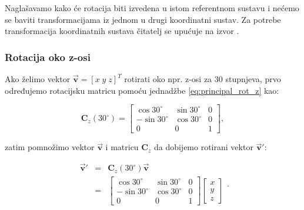 \documentclass[times, utf8, diplomski, numeric]{templates/template}
\begin{document}
{{{            Naglašavamo kako će rotacija biti izvedena u istom referentnom sustavu i nećemo se baviti transformacijama iz jednom u drugi koordinatni sustav. Za potrebe transformacija koordinatnih sustava čitatelj se upućuje na izvor \cite{adcsKnjiga}.

            \subsubsection{Rotacija oko z-osi}{
                Ako želimo vektor $\overrightarrow{\textbf{v}}=\left[ x \; y \; z \right]^T$ rotirati oko npr. z-osi za 30 stupnjeva, prvo određujemo rotacijsku matricu pomoću jednadžbe \ref{eq:principal_rot_z} kao:

                \begin{equation}
                \textbf{C}_{z}(30^{\circ}) = 
                \begin{bmatrix}
                    \cos30^{\circ}   & \sin30^{\circ}    &  0 \\
                    -\sin30^{\circ}  & \cos30^{\circ}    &  0 \\
                    0                & 0                 &  1
                \end{bmatrix}
                ,
                \end{equation}

                zatim pomnožimo vektor $\overrightarrow{\textbf{v}}$ i matricu $\textbf{C}_{z}$ da dobijemo rotirani vektor $\overrightarrow{\textbf{v}}'$:

                \begin{equation}
                \begin{array}{rcl}
                    \overrightarrow{\textbf{v}}' & = & \textbf{C}_{z}(30^{\circ}) \overrightarrow{\textbf{v}} \\
                    & = &
                \begin{bmatrix}
                    \cos30^{\circ}   & \sin30^{\circ}    &  0 \\
                    -\sin30^{\circ}  & \cos30^{\circ}    &  0 \\
                    0                & 0                 &  1
                \end{bmatrix}
                \begin{bmatrix}
                    x \\
                    y \\
                    z
                \end{bmatrix}
                \end{array}
                .
                \end{equation}
            }

}}}
\end{document}
